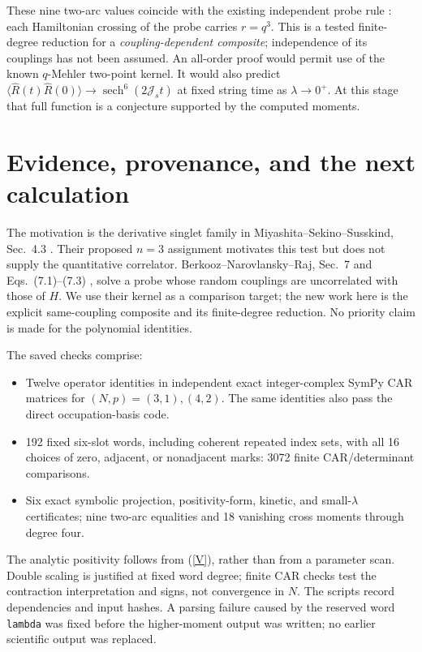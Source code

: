 \documentclass[11pt,a4paper]{article}
\newcommand{\Js}{\mathcal J_s}
\newcommand{\av}[1]{\langle #1\rangle}
\begin{document}
These nine two-arc values coincide with the existing independent
probe rule \cite{BNR}: each Hamiltonian crossing of the probe carries
$r=q^3$. This is a tested finite-degree reduction for a
\emph{coupling-dependent composite}; independence of its couplings
has not been assumed. An all-order proof would permit use of the
known $q$-Mehler two-point kernel. It would also predict
$\av{\widehat R(t)\widehat R(0)}\to\operatorname{sech}^{6}(2\Js t)$
at fixed string time as $\lambda\to0^+$. At this stage that full
function is a conjecture supported by the computed moments.

\newpage
\section{Evidence, provenance, and the next calculation}
The motivation is the derivative singlet family in
Miyashita--Sekino--Susskind, Sec.~4.3 \cite{MSS}. Their proposed
$n=3$ assignment motivates this test but does not supply the
quantitative correlator. Berkooz--Narovlansky--Raj,
Sec.~7 and Eqs.~(7.1)--(7.3) \cite{BNR}, solve a probe whose random
couplings are uncorrelated with those of $H$. We use their kernel
as a comparison target; the new work here is the explicit
same-coupling composite and its finite-degree reduction.
No priority claim is made for the polynomial identities.

The saved checks comprise:
\begin{itemize}
\item Twelve operator identities in independent exact
integer-complex SymPy CAR matrices for $(N,p)=(3,1),(4,2)$.
The same identities also pass the direct occupation-basis code.
\item 192 fixed six-slot words, including coherent repeated index
sets, with all 16 choices of zero, adjacent, or nonadjacent marks:
3072 finite CAR/determinant comparisons.
\item Six exact symbolic projection, positivity-form, kinetic,
and small-$\lambda$ certificates; nine two-arc equalities and
18 vanishing cross moments through degree four.
\end{itemize}
The analytic positivity follows from (\ref{V}), rather than from
a parameter scan. Double scaling is justified at fixed word degree;
finite CAR checks test the contraction interpretation and signs,
not convergence in $N$. The scripts record dependencies and input
hashes. A parsing failure caused by the reserved word
\texttt{lambda} was fixed before the higher-moment output was
written; no earlier scientific output was replaced.
\end{document}
